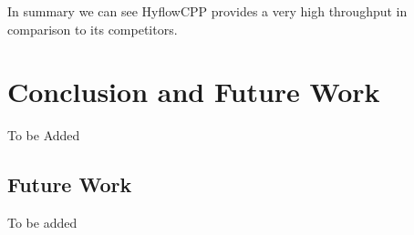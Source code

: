 \documentclass[12pt,english]{report}
\begin{document}
In summary we can see HyflowCPP provides a very high throughput in comparison to its competitors.


\chapter{Conclusion and Future Work}\label{chap:conclusion}

To be Added

\section{Future Work}

To be added

\newpage
{}



\end{document}
